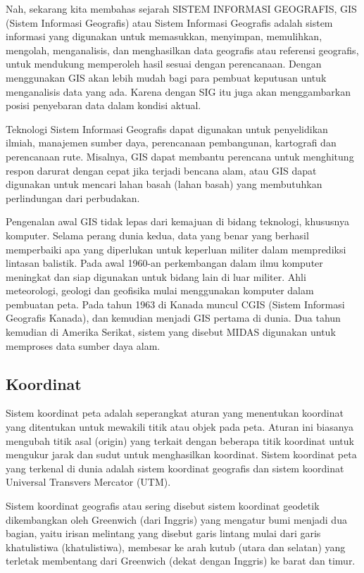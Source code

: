 Nah, sekarang kita membahas sejarah SISTEM INFORMASI GEOGRAFIS, GIS (Sistem Informasi Geografis) atau Sistem Informasi Geografis adalah sistem informasi yang digunakan untuk memasukkan, menyimpan, memulihkan, mengolah, menganalisis, dan menghasilkan data geografis atau referensi geografis, untuk mendukung memperoleh hasil sesuai dengan perencanaan. Dengan menggunakan GIS akan lebih mudah bagi para pembuat keputusan untuk menganalisis data yang ada. Karena dengan SIG itu juga akan menggambarkan posisi penyebaran data dalam kondisi aktual. \hfill\break

Teknologi Sistem Informasi Geografis dapat digunakan untuk penyelidikan ilmiah, manajemen sumber daya, perencanaan pembangunan, kartografi dan perencanaan rute. Misalnya, GIS dapat membantu perencana untuk menghitung respon darurat dengan cepat jika terjadi bencana alam, atau GIS dapat digunakan untuk mencari lahan basah (lahan basah) yang membutuhkan perlindungan dari perbudakan. \hfill\break

Pengenalan awal GIS tidak lepas dari kemajuan di bidang teknologi, khususnya komputer. Selama perang dunia kedua, data yang benar yang berhasil memperbaiki apa yang diperlukan untuk keperluan militer dalam memprediksi lintasan balistik. Pada awal 1960-an perkembangan dalam ilmu komputer meningkat dan siap digunakan untuk bidang lain di luar militer. Ahli meteorologi, geologi dan geofisika mulai menggunakan komputer dalam pembuatan peta.
Pada tahun 1963 di Kanada muncul CGIS (Sistem Informasi Geografis Kanada), dan kemudian menjadi GIS pertama di dunia. Dua tahun kemudian di Amerika Serikat, sistem yang disebut MIDAS digunakan untuk memproses data sumber daya alam. \hfill\break


\subsection{Koordinat}
Sistem koordinat peta adalah seperangkat aturan yang menentukan koordinat yang ditentukan untuk mewakili titik atau objek pada peta. Aturan ini biasanya mengubah titik asal (origin) yang terkait dengan beberapa titik koordinat untuk mengukur jarak dan sudut untuk menghasilkan koordinat. Sistem koordinat peta yang terkenal di dunia adalah sistem koordinat geografis dan sistem koordinat Universal Transvers Mercator (UTM). \hfill\break

Sistem koordinat geografis atau sering disebut sistem koordinat geodetik dikembangkan oleh Greenwich (dari Inggris) yang mengatur bumi menjadi dua bagian, yaitu irisan melintang yang disebut garis lintang mulai dari garis khatulistiwa (khatulistiwa), membesar ke arah kutub (utara dan selatan) yang terletak membentang dari Greenwich (dekat dengan Inggris) ke barat dan timur. \hfill\break

